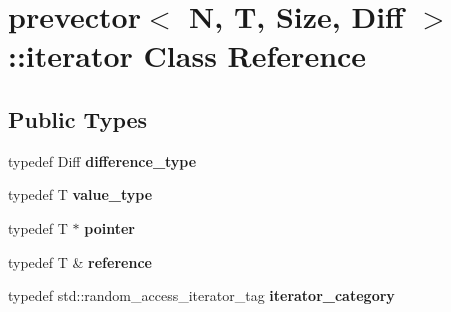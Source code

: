 \hypertarget{classprevector_1_1iterator}{}\section{prevector$<$ N, T, Size, Diff $>$\+::iterator Class Reference}
\label{classprevector_1_1iterator}
\subsection*{Public Types}
\begin{DoxyCompactItemize}
\item 
\mbox{\label{classprevector_1_1iterator_a9540618843eb1657d30f7890d04ee6f0}} 
typedef Diff {\bfseries difference\+\_\+type}
\item 
\mbox{\label{classprevector_1_1iterator_a4ed27e1ffe40f9402eafa1b25d52acc6}} 
typedef T {\bfseries value\+\_\+type}
\item 
\mbox{\label{classprevector_1_1iterator_af25d07eb9d72ffc3f3b302c5f8de62c3}} 
typedef T $\ast$ {\bfseries pointer}
\item 
\mbox{\label{classprevector_1_1iterator_a6341636ac7a5106273407aa3531cb7d4}} 
typedef T \& {\bfseries reference}
\item 
\mbox{\label{classprevector_1_1iterator_accf46d24c818422d68e6ea3ea60305f8}} 
typedef std\+::random\+\_\+access\+\_\+iterator\+\_\+tag {\bfseries iterator\+\_\+category}
\end{DoxyCompactItemize}

